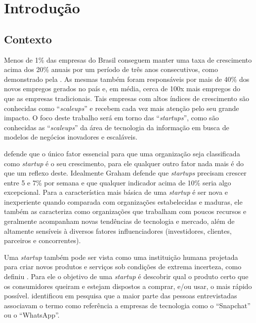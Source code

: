 \chapter{Introdução}
\label{cap-introducao}

\section{Contexto}
\label{section:contexto}

Menos de 1\% das empresas do Brasil conseguem manter uma taxa de crescimento acima dos 20\% anuais por um período de três anos consecutivos, como demonstrado pela . As mesmas também foram responsáveis por mais de 40\% dos novos empregos gerados no país e, em média, cerca de 100x mais empregos do que as empresas tradicionais. Tais empresas com altos índices de crescimento são conhecidas como ``\textit{scaleups}'' e recebem cada vez mais atenção pelo seu grande impacto. O foco deste trabalho será em torno das ``\textit{startups}'', como são conhecidas as ``\textit{scaleups}'' da área de tecnologia da informação em busca de modelos de negócios inovadores e escaláveis.

 defende que o único fator essencial para que uma organização seja classificada como \textit{startup} é o seu crescimento, para ele qualquer outro fator nada mais é do que um reflexo deste. Idealmente Graham defende que \textit{startups} precisam crescer entre 5 e 7\% por semana e que qualquer indicador acima de 10\% seria algo excepcional. Para  a característica mais básica de uma \textit{startup} é ser nova e inexperiente quando comparada com organizações estabelecidas e maduras, ele também as caracteriza como organizações que trabalham com poucos recursos e geralmente acompanham novas tendências de tecnologia e mercado, além de altamente sensíveis à diversos fatores influenciadores (investidores, clientes, parceiros e concorrentes).

Uma \textit{startup} também pode ser vista como uma instituição humana projetada para criar novos produtos e serviços sob condições de extrema incerteza, como definiu . Para ele o objetivo de uma \textit{startup} é descobrir qual o produto certo que os consumidores queiram e estejam dispostos a comprar, e/ou usar, o mais rápido possível.  identificou em pesquisa que a maior parte das pessoas entrevistadas associavam o termo como referência a empresas de tecnologia como o ``Snapchat'' ou o ``WhatsApp''.


